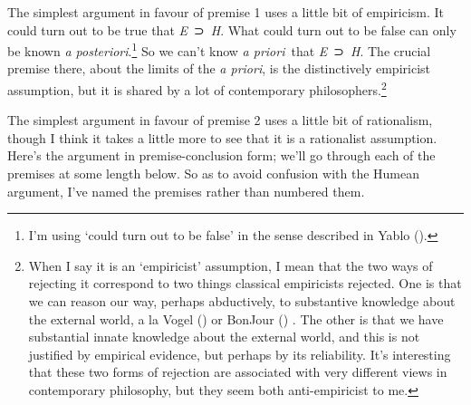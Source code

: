 \documentclass[
  11pt,
  letterpaper,
  DIV=11,
  numbers=noendperiod,
  twoside]{scrartcl}
\begin{document}
The simplest argument in favour of premise 1 uses a little bit of
empiricism. It could turn out to be true that \emph{E}~⊃~\emph{H}. What
could turn out to be false can only be known \emph{a
posteriori}.\footnote{I'm using `could turn out to be false' in the
  sense described in Yablo ().} So we
can't know \emph{a priori}~that \emph{E}~⊃~\emph{H}. The crucial premise
there, about the limits of the \emph{a priori}, is the distinctively
empiricist assumption, but it is shared by a lot of contemporary
philosophers.\footnote{When I say it is an `empiricist' assumption, I
  mean that the two ways of rejecting it correspond to two things
  classical empiricists rejected. One is that we can reason our way,
  perhaps abductively, to substantive knowledge about the external
  world, a la Vogel () or BonJour
  () . The other is that we have
  substantial innate knowledge about the external world, and this is not
  justified by empirical evidence, but perhaps by its reliability. It's
  interesting that these two forms of rejection are associated with very
  different views in contemporary philosophy, but they seem both
  anti-empiricist to me.}

The simplest argument in favour of premise 2 uses a little bit of
rationalism, though I think it takes a little more to see that it is a
rationalist assumption. Here's the argument in premise-conclusion form;
we'll go through each of the premises at some length below. So as to
avoid confusion with the Humean argument, I've named the premises rather
than numbered them.
\end{document}
